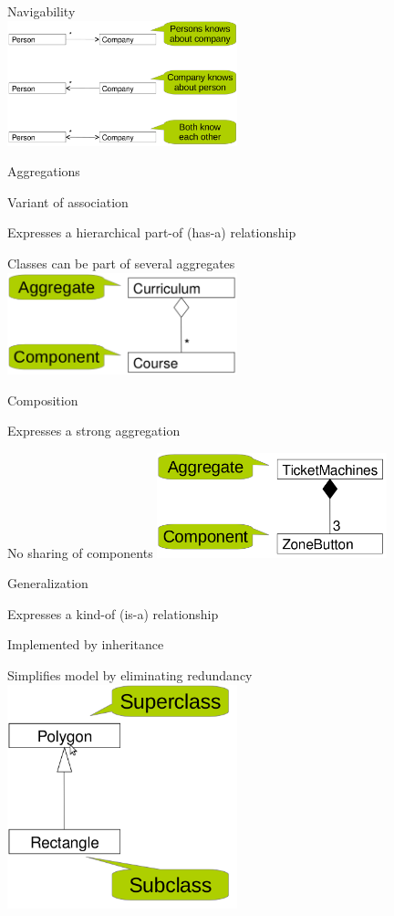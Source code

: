 \documentclass[10pt]{article}
\begin{document}
	\item Navigability
	\\ \includegraphics[width=0.5\textwidth]{association_directed.png}
	
	\item Aggregations
	\enumstart
		\item Variant of association
		\item Expresses a hierarchical part-of (has-a) relationship
		\item Classes can be part of several aggregates
	\enumend
	\includegraphics[width=0.5\textwidth]{aggregation.png}

	\item Composition
	\enumstart
		\item Expresses a strong aggregation
		\item No sharing of components
	\enumend
	\includegraphics[width=0.5\textwidth]{composition.png}
	
	\item Generalization
	\enumstart
		\item Expresses a kind-of (is-a) relationship
		\item Implemented by inheritance
		\item Simplifies model by eliminating redundancy
	\enumend
	\includegraphics[width=0.5\textwidth]{generalization.png}
	
\end{document}

